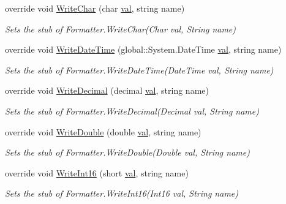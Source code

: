 \begin{DoxyCompactItemize}
override void \hyperlink{class_system_1_1_runtime_1_1_serialization_1_1_fakes_1_1_stub_formatter_addfdd47163455a1f37bed16e56364682}{Write\-Char} (char \hyperlink{jquery-1_810_82-vsdoc_8js_a0888cacd53defa08fbb4972d54ece4b0}{val}, string name)
\begin{DoxyCompactList}\small\item\em Sets the stub of Formatter.\-Write\-Char(\-Char val, String name)\end{DoxyCompactList}\item 
override void \hyperlink{class_system_1_1_runtime_1_1_serialization_1_1_fakes_1_1_stub_formatter_ae94273a2f97c1df7eb4d0000b1d279a2}{Write\-Date\-Time} (global\-::\-System.\-Date\-Time \hyperlink{jquery-1_810_82-vsdoc_8js_a0888cacd53defa08fbb4972d54ece4b0}{val}, string name)
\begin{DoxyCompactList}\small\item\em Sets the stub of Formatter.\-Write\-Date\-Time(\-Date\-Time val, String name)\end{DoxyCompactList}\item 
override void \hyperlink{class_system_1_1_runtime_1_1_serialization_1_1_fakes_1_1_stub_formatter_ac3a542368dc4159bb12a5a3e54721f2a}{Write\-Decimal} (decimal \hyperlink{jquery-1_810_82-vsdoc_8js_a0888cacd53defa08fbb4972d54ece4b0}{val}, string name)
\begin{DoxyCompactList}\small\item\em Sets the stub of Formatter.\-Write\-Decimal(\-Decimal val, String name)\end{DoxyCompactList}\item 
override void \hyperlink{class_system_1_1_runtime_1_1_serialization_1_1_fakes_1_1_stub_formatter_abc8908400f6c0513d8c13dd08bbe5a65}{Write\-Double} (double \hyperlink{jquery-1_810_82-vsdoc_8js_a0888cacd53defa08fbb4972d54ece4b0}{val}, string name)
\begin{DoxyCompactList}\small\item\em Sets the stub of Formatter.\-Write\-Double(\-Double val, String name)\end{DoxyCompactList}\item 
override void \hyperlink{class_system_1_1_runtime_1_1_serialization_1_1_fakes_1_1_stub_formatter_af3e2159537144db0987d77e3a055cc56}{Write\-Int16} (short \hyperlink{jquery-1_810_82-vsdoc_8js_a0888cacd53defa08fbb4972d54ece4b0}{val}, string name)
\begin{DoxyCompactList}\small\item\em Sets the stub of Formatter.\-Write\-Int16(\-Int16 val, String name)\end{DoxyCompactList}\item 

\end{DoxyCompactItemize}

